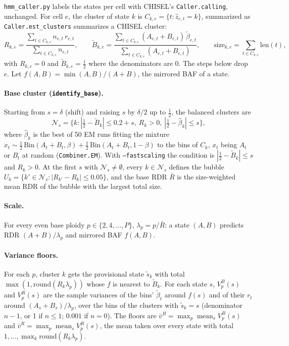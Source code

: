 \documentclass[11pt]{article}
\newcommand{\code}[1]{\texttt{#1}}
\begin{document}
\code{hmm\_caller.py} labels the states per cell with CHISEL's \code{Caller.calling}, unchanged.
For cell $e$, the cluster of state $k$ is $C_{k,e} = \{t : \hat z_{e,t} = k\}$, summarized as
\code{Caller.est\_clusters} summarizes a CHISEL cluster:
\begin{equation}
R_{k,e} = \frac{\sum_{t \in C_{k,e}} n_{e,t}\, r_{e,t}}{\sum_{t \in C_{k,e}} n_{e,t}}, \qquad
\tilde B_{k,e} = \frac{\sum_{t \in C_{k,e}} (A_{e,t}+B_{e,t})\, \tilde\beta_{e,t}}
                      {\sum_{t \in C_{k,e}} (A_{e,t}+B_{e,t})}, \qquad
\mathrm{size}_{k,e} = \sum_{t \in C_{k,e}} \mathrm{len}(t),
\end{equation}
with $R_{k,e} = 0$ and $\tilde B_{k,e} = \tfrac12$ where the denominators are 0. The steps
below drop $e$. Let $f(A,B) = \min(A,B)/(A+B)$, the mirrored BAF of a state.

\paragraph{Base cluster (\code{identify\_base}).}
Starting from $s = \delta$ (shift) and raising $s$ by $\delta/2$ up to $\tfrac12$, the balanced
clusters are
\begin{equation}
\mathcal{N}_s = \bigl\{k : |\tfrac12 - \tilde B_k| \le 0.2 + s,\ R_k > 0,\ |\tfrac12 - \hat\beta_k| \le s\bigr\},
\end{equation}
where $\hat\beta_k$ is the best of 50 EM runs fitting the mixture
$x_t \sim \tfrac12\,\mathrm{Bin}(A_t+B_t, \beta) + \tfrac12\,\mathrm{Bin}(A_t+B_t, 1-\beta)$
to the bins of $C_k$, $x_t$ being $A_t$ or $B_t$ at random (\code{Combiner.EM}). With
\code{--fastscaling} the condition is $|\tfrac12 - \tilde B_k| \le s$ and $R_k > 0$. At the
first $s$ with $\mathcal{N}_s \ne \emptyset$, every $k \in \mathcal{N}_s$ defines the bubble
$U_k = \{k' \in \mathcal{N}_s : |R_{k'} - R_k| \le 0.05\}$, and the base RDR $\bar R$ is the
size-weighted mean RDR of the bubble with the largest total size.

\paragraph{Scale.}
For every even base ploidy $p \in \{2, 4, \dots, P\}$, $\lambda_p = p / \bar R$: a state $(A,B)$
predicts RDR $(A+B)/\lambda_p$ and mirrored BAF $f(A,B)$.

\paragraph{Variance floors.}
For each $p$, cluster $k$ gets the provisional state $\tilde s_k$ with total
$\max(1, \mathrm{round}(R_k \lambda_p))$ whose $f$ is nearest to $\tilde B_k$. For each state
$s$, $V^B_p(s)$ and $V^R_p(s)$ are the sample variances of the bins' $\tilde\beta_t$ around
$f(s)$ and of their $r_t$ around $(A_s+B_s)/\lambda_p$, over the bins of the clusters with
$\tilde s_k = s$ (denominator $n-1$, or 1 if $n \le 1$; $0.001$ if $n = 0$). The floors are
$\bar v^B = \max_p \operatorname{mean}_s V^B_p(s)$ and
$\bar v^R = \max_p \operatorname{mean}_s V^R_p(s)$, the mean taken over every state with total
$1, \dots, \max_k \mathrm{round}(R_k\lambda_p)$.
\end{document}

